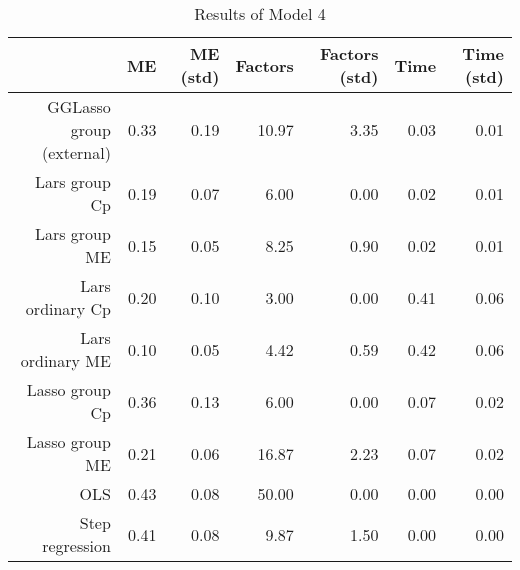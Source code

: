 \begin{table}[ht]
\centering
\begin{tabular}{rrrrrrr}
  \hline
 & ME & ME (std) & Factors & Factors (std) & Time & Time (std) \\ 
  \hline
GGLasso group (external) & 0.33 & 0.19 & 10.97 & 3.35 & 0.03 & 0.01 \\ 
  Lars group Cp & 0.19 & 0.07 & 6.00 & 0.00 & 0.02 & 0.01 \\ 
  Lars group ME & 0.15 & 0.05 & 8.25 & 0.90 & 0.02 & 0.01 \\ 
  Lars ordinary Cp & 0.20 & 0.10 & 3.00 & 0.00 & 0.41 & 0.06 \\ 
  Lars ordinary ME & 0.10 & 0.05 & 4.42 & 0.59 & 0.42 & 0.06 \\ 
  Lasso group Cp & 0.36 & 0.13 & 6.00 & 0.00 & 0.07 & 0.02 \\ 
  Lasso group ME & 0.21 & 0.06 & 16.87 & 2.23 & 0.07 & 0.02 \\ 
  OLS & 0.43 & 0.08 & 50.00 & 0.00 & 0.00 & 0.00 \\ 
  Step regression & 0.41 & 0.08 & 9.87 & 1.50 & 0.00 & 0.00 \\ 
   \hline
\end{tabular}
\caption{Results of Model 4} 
\end{table}
